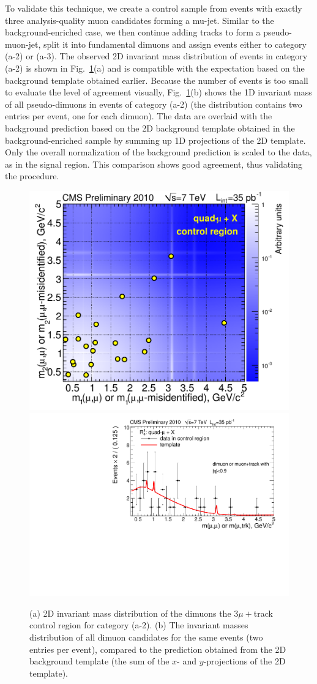 To validate this technique, we create a control sample from events
with exactly three analysis-quality muon candidates forming a
mu-jet. Similar to the background-enriched case, we then continue
adding tracks to form a pseudo-muon-jet, split it into fundamental
dimuons and assign events either to category (a-2) or (a-3). The
observed 2D invariant mass distribution of events in category (a-2) is
shown in Fig.~\ref{fig:backgroundControl_fakes}(a) and is compatible
with the expectation based on the background template obtained
earlier. Because the number of events is too small to evaluate the level
of agreement visually, Fig.~\ref{fig:backgroundControl_fakes}(b) shows
the 1D invariant mass of all pseudo-dimuons in events of category
(a-2) (the distribution contains two entries per event, one for each
dimuon). The data are overlaid with the background prediction based on
the 2D background template obtained in the background-enriched sample
by summing up 1D projections of the 2D template. Only the overall
normalization of the background prediction is scaled to the data, as
in the signal region. This comparison shows good agreement, thus validating
the procedure.

\begin{figure}[tbh]
\centering
\includegraphics[width=0.35\linewidth]{PLOTS/a2_control.pdf}
\includegraphics[width=0.5\linewidth]{PLOTS/template_control__bkg_model_a2__m_1.pdf}
\caption{(a) 2D invariant mass distribution of the dimuons the $3
  \mu+$track control region for category (a-2). (b) The invariant
  masses distribution of all dimuon candidates for the same events
  (two entries per event), compared to the prediction obtained from
  the 2D background template (the sum of the $x$- and
  $y$-projections of the 2D template).\label{fig:backgroundControl_fakes}}
\end{figure}

